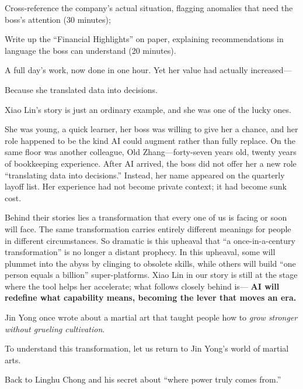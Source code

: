 {\kaiti Cross-reference the company's actual situation, flagging anomalies that need the boss's attention (30 minutes);}

{\kaiti Write up the ``Financial Highlights'' on paper, explaining recommendations in language the boss can understand (20 minutes).}

A full day's work, now done in one hour. Yet her value had actually increased---

Because she translated data into decisions.

\vspace{1em}

Xiao Lin's story is just an ordinary example, and she was one of the lucky ones.

She was young, a quick learner, her boss was willing to give her a chance, and her role happened to be the kind AI could augment rather than fully replace. On the same floor was another colleague, Old Zhang---forty-seven years old, twenty years of bookkeeping experience. After AI arrived, the boss did not offer her a new role ``translating data into decisions.'' Instead, her name appeared on the quarterly layoff list. Her experience had not become private context; it had become sunk cost.

\vspace{1em}

Behind their stories lies a transformation that every one of us is facing or soon will face. The same transformation carries entirely different meanings for people in different circumstances. So dramatic is this upheaval that ``a once-in-a-century transformation'' is no longer a distant prophecy.
In this upheaval, some will plummet into the abyss by clinging to obsolete skills, while others will build ``one person equals a billion'' super-platforms.
Xiao Lin in our story is still at the stage where the tool helps her accelerate; what follows closely behind is---
\textbf{AI will redefine what capability means, becoming the lever that moves an era.}

\vspace{1em}

Jin Yong once wrote about a martial art that taught people how to \emph{grow stronger without grueling cultivation}.

To understand this transformation, let us return to Jin Yong's world of martial arts.

Back to Linghu Chong and his secret about ``where power truly comes from.''

\newpage

